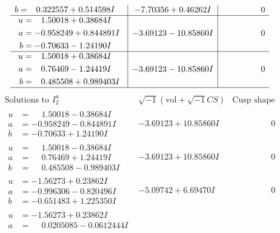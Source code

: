\documentclass[1p]{elsarticle_modified}
\theoremstyle{definition}
\newcommand{\I}{\sqrt{-1}}
\begin{document}
$$\begin{array}{c|c|c}
\begin{aligned}
b &= \phantom{-}0.322557 + 0.514598 I\end{aligned}
 & -7.70356 + 0.46262 I & \phantom{-0.000000 } 0 \\ \hline\begin{aligned}
u &= \phantom{-}1.50018 + 0.38684 I \\
a &= -0.958249 + 0.844891 I \\
b &= -0.70633 - 1.24190 I\end{aligned}
 & -3.69123 - 10.85860 I & \phantom{-0.000000 } 0 \\ \hline\begin{aligned}
u &= \phantom{-}1.50018 + 0.38684 I \\
a &= \phantom{-}0.76469 - 1.24419 I \\
b &= \phantom{-}0.485508 + 0.989403 I\end{aligned}
 & -3.69123 - 10.85860 I & \phantom{-0.000000 } 0\\
 \hline 
 \end{array}$$\newpage$$\begin{array}{c|c|c}  
\text{Solutions to }I^u_{2}& \I (\text{vol} + \sqrt{-1}CS) & \text{Cusp shape}\\
 \hline 
\begin{aligned}
u &= \phantom{-}1.50018 - 0.38684 I \\
a &= -0.958249 - 0.844891 I \\
b &= -0.70633 + 1.24190 I\end{aligned}
 & -3.69123 + 10.85860 I & \phantom{-0.000000 } 0 \\ \hline\begin{aligned}
u &= \phantom{-}1.50018 - 0.38684 I \\
a &= \phantom{-}0.76469 + 1.24419 I \\
b &= \phantom{-}0.485508 - 0.989403 I\end{aligned}
 & -3.69123 + 10.85860 I & \phantom{-0.000000 } 0 \\ \hline\begin{aligned}
u &= -1.56273 + 0.23862 I \\
a &= -0.996306 - 0.820496 I \\
b &= -0.651483 + 1.225350 I\end{aligned}
 & -5.09742 + 6.69470 I & \phantom{-0.000000 } 0 \\ \hline\begin{aligned}
u &= -1.56273 + 0.23862 I \\
a &= \phantom{-}0.0205085 - 0.0612444 I \\

\end{aligned}
\end{array}$$
\end{document}
